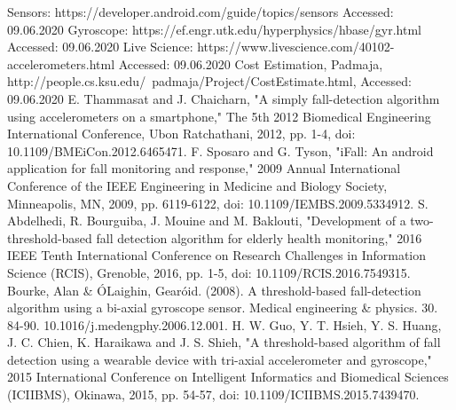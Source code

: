 \documentclass[conference]{IEEEtran}
\begin{document}
\begin{thebibliography}{00}
 Sensors: https://developer.android.com/guide/topics/sensors Accessed: 09.06.2020
 Gyroscope:
https://ef.engr.utk.edu/hyperphysics/hbase/gyr.html Accessed: 09.06.2020
 Live Science: https://www.livescience.com/40102-accelerometers.html Accessed: 09.06.2020
 Cost Estimation, Padmaja,  http://people.cs.ksu.edu/~padmaja/Project/CostEstimate.html,  Accessed: 09.06.2020
E. Thammasat and J. Chaicharn, "A simply fall-detection algorithm using accelerometers on a smartphone," The 5th 2012 Biomedical Engineering International Conference, Ubon Ratchathani, 2012, pp. 1-4, doi: 10.1109/BMEiCon.2012.6465471.
F. Sposaro and G. Tyson, "iFall: An android application for fall monitoring and response," 2009 Annual International Conference of the IEEE Engineering in Medicine and Biology Society, Minneapolis, MN, 2009, pp. 6119-6122, doi: 10.1109/IEMBS.2009.5334912.
S. Abdelhedi, R. Bourguiba, J. Mouine and M. Baklouti, "Development of a two-threshold-based fall detection algorithm for elderly health monitoring," 2016 IEEE Tenth International Conference on Research Challenges in Information Science (RCIS), Grenoble, 2016, pp. 1-5, doi: 10.1109/RCIS.2016.7549315.
Bourke, Alan & ÓLaighin, Gearóid. (2008). A threshold-based fall-detection algorithm using a bi-axial gyroscope sensor. Medical engineering & physics. 30. 84-90. 10.1016/j.medengphy.2006.12.001.
H. W. Guo, Y. T. Hsieh, Y. S. Huang, J. C. Chien, K. Haraikawa and J. S. Shieh, "A threshold-based algorithm of fall detection using a wearable device with tri-axial accelerometer and gyroscope," 2015 International Conference on Intelligent Informatics and Biomedical Sciences (ICIIBMS), Okinawa, 2015, pp. 54-57, doi: 10.1109/ICIIBMS.2015.7439470.

\end{thebibliography}
\vspace{12pt}
\end{document}
